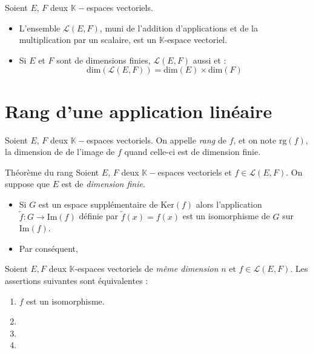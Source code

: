 \documentclass[a4paper,10pt]{report}
\begin{document}
\begin{Proposition}{} Soient $E$, $F$ deux $\mathbb{K}-$espaces vectoriels.

\begin{itemize}
\item L'ensemble $\mathcal{L}(E,F)$, muni de l'addition d'applications et de la multiplication par un scalaire, est un $\mathbb{K}$-espace vectoriel.
\item Si $E$ et $F$ sont de dimensions finies, $\mathcal{L}(E,F)$ aussi et :
$$ \textrm{dim}( \mathcal{L}(E,F)) = \textrm{dim}(E) \times \textrm{dim}(F)$$
\end{itemize}
\end{Proposition}

\section{Rang d'une application linéaire}

\begin{Definition}{} Soient $E$, $F$ deux $\mathbb{K}-$espaces vectoriels. On appelle \emph{rang} de $f$, et on note $\textrm{rg}(f)$, la dimension de de l'image de $f$ quand celle-ci est de dimension finie.
\end{Definition}

\begin{Theoreme}{Théorème du rang} Soient $E$, $F$ deux $\mathbb{K}-$espaces vectoriels et $f \in \mathcal{L}(E,F)$. On suppose que $E$ est de \emph{dimension finie}.

\begin{itemize}
\item Si $G$ est un espace supplémentaire de $\textrm{Ker}(f)$ alors l'application $\tilde{f} : G \rightarrow\textrm{Im}(f)$ définie par \newline $\tilde{f}(x)=f(x)$ est un isomorphisme de $G$ sur $\textrm{Im}(f)$.
\item Par conséquent, 
\end{itemize}
\end{Theoreme}

\begin{Theoreme}{} Soient $E, F$ deux $\mathbb{K}$-espaces vectoriels de \emph{même dimension} $n$ et $f \in \mathcal{L}(E,F)$. Les assertions suivantes sont équivalentes :

\begin{enumerate}
\item $f$ est un isomorphisme.
\item \phantom{$f$ est injective.}
\item \phantom{$f$ est surjective.}
\item \phantom{Le rang de $f$ est égal à $n$.}
\end{enumerate}
\end{Theoreme}
\end{document}

